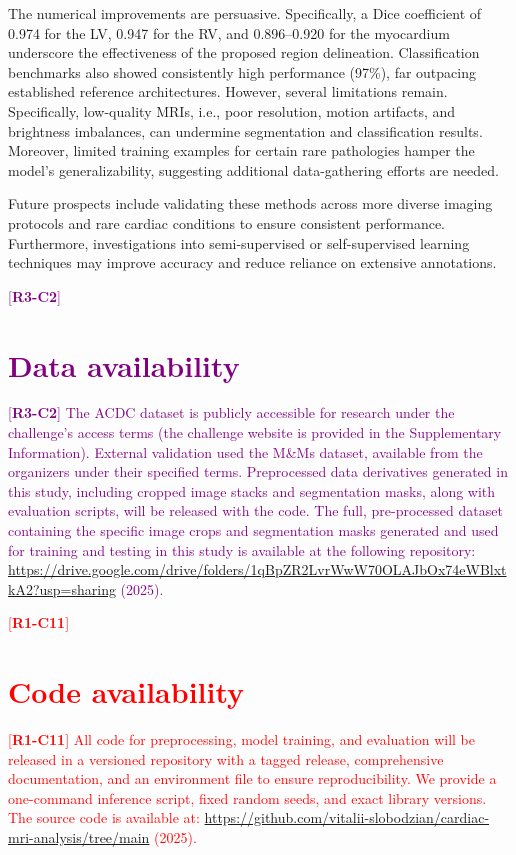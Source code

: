 \documentclass[fleqn,10pt]{wlscirep}
\newcommand{\revtag}[2]{[\textbf{R#1-C#2}]}
\newcommand{\Rone}[1]{\textcolor{red}{#1}}
\newcommand{\Rthree}[1]{\textcolor{purple}{#1}}
\begin{document}
The numerical improvements are persuasive. Specifically, a Dice coefficient of 0.974 for the LV, 0.947 for the RV, and 0.896–0.920 for the myocardium underscore the effectiveness of the proposed region delineation. Classification benchmarks also showed consistently high performance (97\%), far outpacing established reference architectures. However, several limitations remain. Specifically, low-quality MRIs, i.e., poor resolution, motion artifacts, and brightness imbalances, can undermine segmentation and classification results. Moreover, limited training examples for certain rare pathologies hamper the model’s generalizability, suggesting additional data-gathering efforts are needed.

Future prospects include validating these methods across more diverse imaging protocols and rare cardiac conditions to ensure consistent performance. Furthermore, investigations into semi-supervised or self-supervised learning techniques may improve accuracy and reduce reliance on extensive annotations.

\Rthree{\revtag{3}{2}\section*{Data availability}}
\Rthree{\revtag{3}{2} %
The ACDC dataset\cite{Bernard:2018} is publicly accessible for research under the challenge’s access terms (the challenge website is provided in the Supplementary Information). External validation used the M\&Ms dataset\cite{Campello:2021}, available from the organizers under their specified terms. Preprocessed data derivatives generated in this study, including cropped image stacks and segmentation masks, along with evaluation scripts, will be released with the code. The full, pre-processed dataset containing the specific image crops and segmentation masks generated and used for training and testing in this study is available at the following repository: \url{https://drive.google.com/drive/folders/1qBpZR2LvrWwW70OLAJbOx74eWBlxtkA2?usp=sharing} (2025).
}

\Rone{\revtag{1}{11}\section*{Code availability}}
\Rone{\revtag{1}{11} %
All code for preprocessing, model training, and evaluation will be released in a versioned repository with a tagged release, comprehensive documentation, and an environment file to ensure reproducibility. We provide a one-command inference script, fixed random seeds, and exact library versions. The source code is available at: \url{https://github.com/vitalii-slobodzian/cardiac-mri-analysis/tree/main} (2025).
}
\end{document}
